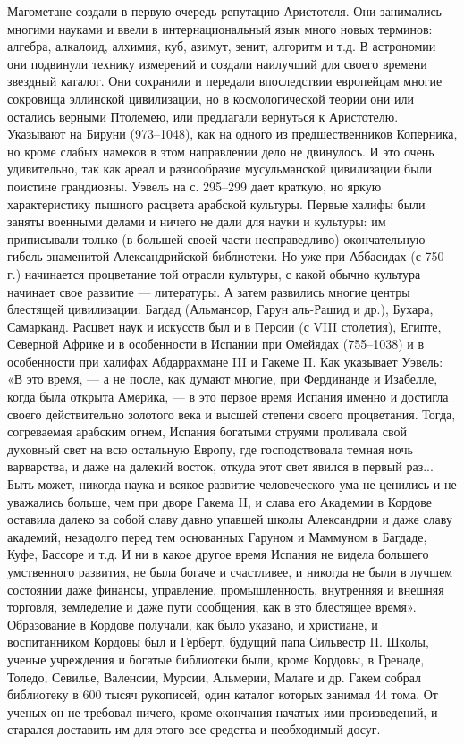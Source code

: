 Магометане  создали   в  первую  очередь  репутацию   Аристотеля.  Они
занимались  многими науками  и  ввели в  интернациональный язык  много
новых  терминов:  алгебра,  алкалоид,  алхимия,  куб,  азимут,  зенит,
алгоритм  и  т.д.  В  астрономии они  подвинули  технику  измерений  и
создали наилучший  для своего времени звездный  каталог. Они сохранили
и   передали  впоследствии   европейцам  многие   сокровища  эллинской
цивилизации,  но в  космологической  теории они  или остались  верными
Птолемею, или  предлагали вернуться к Аристотелю.  Указывают на Бируни
(973--1048),  как на  одного из  предшественников Коперника,  но кроме
слабых  намеков в  этом направлении  дело  не двинулось.  И это  очень
удивительно, так  как ареал  и разнообразие  мусульманской цивилизации
были поистине грандиозны. Уэвель на с. 295--299 дает краткую, но яркую
характеристику пышного расцвета арабской  культуры. Первые халифы были
заняты  военными делами  и ничего  не дали  для науки  и культуры:  им
приписывали только (в большей своей части несправедливо) окончательную
гибель  знаменитой Александрийской  библиотеки. Но  уже при  Аббасидах
(с  750  г.) начинается  процветание  той  отрасли культуры,  с  какой
обычно  культура  начинает  свое  развитие  ---  литературы.  А  затем
развились  многие  центры  блестящей цивилизации:  Багдад  (Альмансор,
Гарун аль-Рашид и др.), Бухара, Самарканд. Расцвет наук и искусств был
и в Персии (с VIII столетия),  Египте, Северной Африке и в особенности
в  Испании  при  Омейядах  (755--1038) и  в  особенности  при  халифах
Абдаррахмане III и Гакеме II. Как  указывает Уэвель: «В это время, ---
а  не после,  как  думают  многие, при  Фердинанде  и Изабелле,  когда
была  открыта  Америка,  ---  в  это первое  время  Испания  именно  и
достигла своего  действительно золотого  века и высшей  степени своего
процветания.  Тогда,  согреваемая  арабским  огнем,  Испания  богатыми
струями  проливала свой  духовный свет  на всю  остальную Европу,  где
господствовала  темная  ночь варварства,  и  даже  на далекий  восток,
откуда этот  свет явился в первый  раз... Быть может, никогда  наука и
всякое развитие человеческого  ума не ценились и  не уважались больше,
чем  при дворе  Гакема II,  и слава  его Академии  в Кордове  оставила
далеко за  собой славу  давно упавшей школы  Александрии и  даже славу
академий, незадолго перед тем основанных Гаруном и Маммуном в Багдаде,
Куфе,  Бассоре и  т.д. И  ни в  какое другое  время Испания  не видела
большего умственного развития, не была  богаче и счастливее, и никогда
не были  в лучшем состоянии даже  финансы, управление, промышленность,
внутренняя и внешняя торговля, земледелие и даже пути сообщения, как в
это  блестящее  время».  Образование  в  Кордове  получали,  как  было
указано, и христиане,  и воспитанником Кордовы был  и Герберт, будущий
папа Сильвестр II. Школы, ученые учреждения и богатые библиотеки были,
кроме Кордовы, в Гренаде, Толедо, Севилье, Валенсии, Мурсии, Альмерии,
Малаге  и др.  Гакем собрал  библиотеку  в 600  тысяч рукописей,  один
каталог  которых занимал  44 тома.  От ученых  он не  требовал ничего,
кроме окончания начатых ими произведений,  и старался доставить им для
этого все средства и необходимый досуг.


